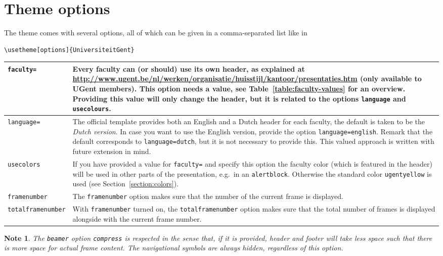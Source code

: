 \documentclass[a4paper,10pt]{article}
\newtheorem{note}{Note}
\begin{document}
\section{Theme options}

The theme comes with several options, all of which can be given in a comma-separated list like in
\begin{lstlisting}
\usetheme[options]{UniversiteitGent}
\end{lstlisting}

\begin{center}
\begin{tabulary}{12cm}{p{3cm}L}
  \toprule
  \lstinline|faculty=| & Every faculty can (or should) use its own header, as explained at \url{http://www.ugent.be/nl/werken/organisatie/huisstijl/kantoor/presentaties.htm} (only available to UGent members). This option needs a value, see Table~\ref{table:faculty-values} for an overview. Providing this value will only change the header, but it is related to the options \lstinline|language| and \lstinline|usecolours|. \\\midrule
  \lstinline|language=| & The official template provides both an English and a Dutch header for each faculty, the default is taken to be the \emph{Dutch version}. In case you want to use the English version, provide the option \lstinline|language=english|. Remark that the default corresponds to \lstinline|language=dutch|, but it is not necessary to provide this. This valued approach is written with future extension in mind. \\\midrule
  \lstinline|usecolors| & If you have provided a value for \lstinline|faculty=| and specify this option the faculty color (which is featured in the header) will be used in other parts of the presentation, e.g.\ in an \lstinline|alertblock|. Otherwise the standard color \lstinline|ugentyellow| is used (see Section~\ref{section:colors}). \\\midrule
  \lstinline!framenumber! &  The \lstinline!framenumber! option makes sure that the number of the current frame is displayed. \\\midrule
  \lstinline!totalframenumber! & With \lstinline!framenumber! turned on, the \lstinline!totalframenumber! option makes sure that the total number of frames is displayed alongside with the current frame number.\\\bottomrule
  \end{tabulary}
\end{center}

\begin{note}
  The \texttt{beamer} option \lstinline!compress! is respected in the sense that, if it is provided, header and footer will take less space such that there is more space for actual frame content. The navigational symbols are always hidden, regardless of this option.
\end{note}
\end{document}
